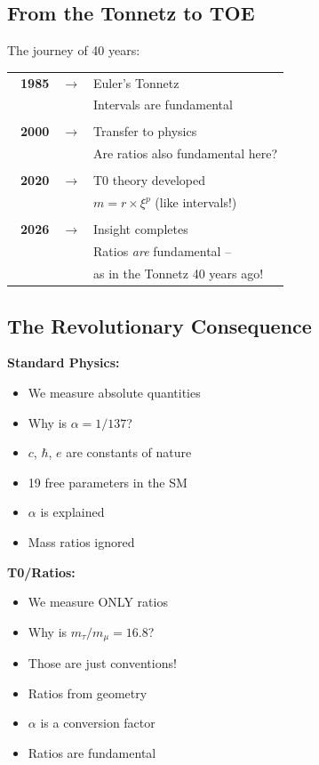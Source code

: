 \subsection{From the Tonnetz to TOE}

The journey of 40 years:

\begin{center}
	\begin{tabular}{rcl}
		\textbf{~1985} & $\longrightarrow$ & Euler's Tonnetz \\
		&  & Intervals are fundamental \\
		&  & \\
		\textbf{~2000} & $\longrightarrow$ & Transfer to physics \\
		&  & Are ratios also fundamental here? \\
		&  & \\
		\textbf{~2020} & $\longrightarrow$ & T0 theory developed \\
		&  & $m = r \times \xi^p$ (like intervals!) \\
		&  & \\
		\textbf{2026} & $\longrightarrow$ & Insight completes \\
		&  & Ratios \textit{are} fundamental -- \\
		&  & as in the Tonnetz 40 years ago! \\
	\end{tabular}
\end{center}

\subsection{The Revolutionary Consequence}

\vspace{0.5cm}
\noindent
\begin{minipage}[t]{0.48\textwidth}
	\textbf{Standard Physics:}
	\begin{itemize}[nosep]
		\item We measure absolute quantities
		\item Why is $\alpha = 1/137$?
		\item $c$, $\hbar$, $e$ are constants of nature
		\item 19 free parameters in the SM
		\item $\alpha$ is explained
		\item Mass ratios ignored
	\end{itemize}
\end{minipage}
\hfill
\begin{minipage}[t]{0.48\textwidth}
	\textbf{T0/Ratios:}
	\begin{itemize}[nosep]
		\item We measure ONLY ratios
		\item Why is $m_\tau/m_\mu = 16.8$?
		\item Those are just conventions!
		\item Ratios from geometry
		\item $\alpha$ is a conversion factor
		\item Ratios are fundamental
	\end{itemize}
\end{minipage}
\vspace{0.5cm}

